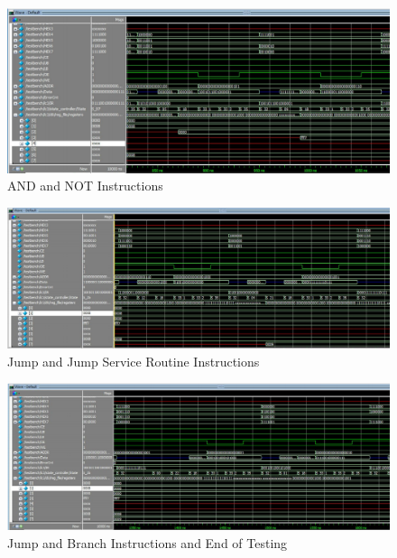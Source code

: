 \documentclass[journal, twocolumn, final,11pt,letterpaper]{IEEEtran}
\begin{document}
\begin{figure} [htbp]
	\centering
	\includegraphics[scale=0.7]{AND_NOT.png}
	\caption{AND and NOT Instructions\label{fig:ISDU-circuit}}
\end{figure}

\begin{figure} [htbp]
	\centering
	\includegraphics[scale=0.7]{JMP_JSR.png}
	\caption{Jump and Jump Service Routine Instructions\label{fig:ISDU-circuit}}
\end{figure}

\begin{figure} [htbp]
	\centering
	\includegraphics[scale=0.7]{JSR_BR_after.png}
	\caption{Jump and Branch Instructions and End of Testing\label{fig:ISDU-circuit}}
\end{figure}



\clearpage 
\end{document}
